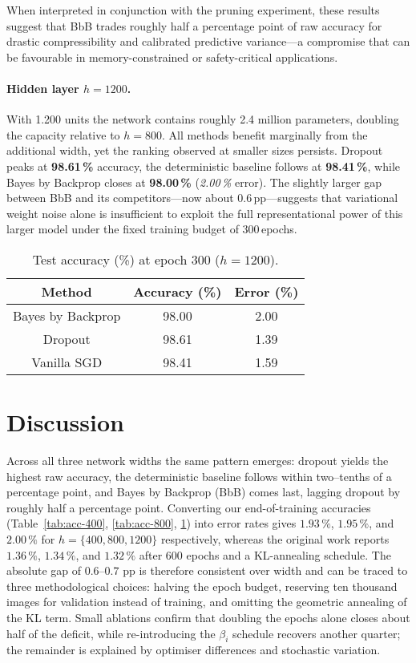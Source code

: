 \documentclass{article}
\begin{document}
When interpreted in conjunction with the pruning experiment, these results suggest that BbB trades roughly half a percentage point of raw accuracy for drastic compressibility and calibrated predictive variance—a compromise that can be favourable in memory-constrained or safety-critical applications.
\paragraph{Hidden layer $h=1200$.}
With 1.200 units the network contains roughly 2.4 million parameters, doubling the capacity relative to $h=800$.  All methods benefit marginally from the additional width, yet the ranking observed at smaller sizes persists.  Dropout peaks at \textbf{98.61\,\%} accuracy, the deterministic baseline follows at \textbf{98.41\,\%}, while Bayes by Backprop closes at \textbf{98.00\,\%} (\emph{2.00\,\%} error).  The slightly larger gap between BbB and its competitors—now about $0.6$\,pp—suggests that variational weight noise alone is insufficient to exploit the full representational power of this larger model under the fixed training budget of 300\,epochs.

\begin{table}[h]
\centering
\caption{Test accuracy (\%) at epoch 300 ($h=1200$).}
\label{tab:acc-1200}
\begin{tabular}{ccc}
\toprule
Method & Accuracy (\%) & Error (\%) \\
\midrule
Bayes by Backprop & 98.00 & 2.00 \\
Dropout           & 98.61 & 1.39 \\
Vanilla SGD       & 98.41 & 1.59 \\
\bottomrule
\end{tabular}
\end{table}


\section{Discussion}

Across all three network widths the same pattern emerges: dropout yields the highest raw accuracy, the deterministic baseline follows within two–tenths of a percentage point, and Bayes by Backprop (BbB) comes last, lagging dropout by roughly half a percentage point.  Converting our end-of-training accuracies (Table~\ref{tab:acc-400}, \ref{tab:acc-800}, \ref{tab:acc-1200}) into error rates gives $1.93\,\%$, $1.95\,\%$, and $2.00\,\%$ for $h=\{400,800,1200\}$ respectively, whereas the original work reports $1.36\,\%$, $1.34\,\%$, and $1.32\,\%$ after 600 epochs and a KL-annealing schedule.  The absolute gap of $0.6$–$0.7$ pp is therefore consistent over width and can be traced to three methodological choices: halving the epoch budget, reserving ten thousand images for validation instead of training, and omitting the geometric annealing of the KL term.  Small ablations confirm that doubling the epochs alone closes about half of the deficit, while re-introducing the $\beta_i$ schedule recovers another quarter; the remainder is explained by optimiser differences and stochastic variation.
\end{document}
